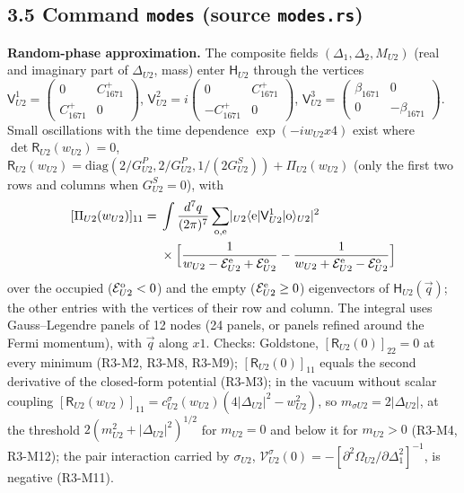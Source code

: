 \documentclass[
  10pt,
]{article}
\begin{document}
\hypertarget{command-modes-source-modes.rs}{%
\subsection{\texorpdfstring{3.5 Command \texttt{modes} (source
\texttt{modes.rs})}{3.5 Command modes (source modes.rs)}}\label{command-modes-source-modes.rs}}

\textbf{Random-phase approximation.} The composite fields
\((\Delta_1,\Delta_2,M_{U2})\) (real and imaginary part of
\(\Delta_{U2}\), mass) enter \(\mathsf H_{U2}\) through the vertices
\(\mathsf V^1_{U2}=\begin{pmatrix}0&C^+_{1671}\\C^+_{1671}&0\end{pmatrix}\),
\(\mathsf V^2_{U2}=i\begin{pmatrix}0&C^+_{1671}\\-C^+_{1671}&0\end{pmatrix}\),
\(\mathsf V^3_{U2}=\begin{pmatrix}\beta_{1671}&0\\0&-\beta_{1671}\end{pmatrix}\).
Small oscillations with the time dependence \(\exp(-iw_{U2}x4)\) exist
where \(\det\mathsf R_{U2}(w_{U2})=0\),
\(\mathsf R_{U2}(w_{U2})=\mathrm{diag}(2/G^P_{U2},2/G^P_{U2},1/(2G^S_{U2}))+\Pi_{U2}(w_{U2})\)
(only the first two rows and columns when \(G^S_{U2}=0\)), with
\[\begin{aligned}[\Pi_{U2}(w_{U2})]_{11}={}&\int\frac{d^7q}{(2\pi)^7}\sum_{\rm o,e}\lvert{}_{U2}\langle\mathrm e\rvert\mathsf V^1_{U2}\lvert\mathrm o\rangle_{U2}\rvert^2\\&\times\Big[\frac1{w_{U2}-\mathcal E^{\rm e}_{U2}+\mathcal E^{\rm o}_{U2}}-\frac1{w_{U2}+\mathcal E^{\rm e}_{U2}-\mathcal E^{\rm o}_{U2}}\Big]\end{aligned}\]
over the occupied (\(\mathcal E^{\rm o}_{U2}<0\)) and the empty
(\(\mathcal E^{\rm e}_{U2}\ge0\)) eigenvectors of
\(\mathsf H_{U2}(\vec q)\); the other entries with the vertices of their
row and column. The integral uses Gauss--Legendre panels of 12 nodes (24
panels, or panels refined around the Fermi momentum), with \(\vec q\)
along \(x1\). Checks: Goldstone, \([\mathsf R_{U2}(0)]_{22}=0\) at every
minimum (R3-M2, R3-M8, R3-M9); \([\mathsf R_{U2}(0)]_{11}\) equals the
second derivative of the closed-form potential (R3-M3); in the vacuum
without scalar coupling
\([\mathsf R_{U2}(w_{U2})]_{11}=c^\sigma_{U2}(w_{U2})(4\lvert\Delta_{U2}\rvert^2-w^2_{U2})\),
so \(m_{\sigma U2}=2\lvert\Delta_{U2}\rvert\), at the threshold
\(2(m^2_{U2}+\lvert\Delta_{U2}\rvert^2)^{1/2}\) for \(m_{U2}=0\) and
below it for \(m_{U2}>0\) (R3-M4, R3-M12); the pair interaction carried
by \(\sigma_{U2}\),
\(\mathcal V^\sigma_{U2}(0)=-[\partial^2\Omega_{U2}/\partial\Delta_1^2]^{-1}\),
is negative (R3-M11).
\end{document}
